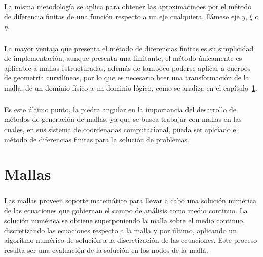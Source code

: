 \documentclass[letterpaper, openright, 12pt]{book}
\begin{document}
    \paragraph*{}
    La misma metodología se aplica para obtener las aproximacinoes por el método
    de diferencia finitas de una función respecto a un eje cualquiera, llámese
    eje $y$, $\xi$ o $\eta$.

    \paragraph*{}
    La mayor ventaja que presenta el método de diferencias finitas es su
    simplicidad de implementación, aunque presenta una limitante, el método
    únicamente es aplicable a mallas estructuradas, además de tampoco poderse
    aplicar a cuerpos de geometría curvilíneas, por lo que es necesario hcer una
    transformación de la malla, de un dominio físico a un dominio lógico, como
    se analiza en el capítulo~\ref{chap:mallas}.

    \paragraph*{}
    Es este último punto, la piedra angular en la importancia del desarrollo de
    métodos de generación de mallas, ya que se busca trabajar con mallas en las
    cuales, en sus sistema de coordenadas computacional, pueda ser aplciado el
    método de diferencias finitas para la solución de problemas.

    \chapter{Mallas}
    \label{chap:mallas}
    \paragraph*{}
    Las mallas proveen soporte matemático para llevar a cabo una solución
    numérica de las ecuaciones que gobiernan el campo de análisis como medio
    continuo. La solución numérica se obtiene superponiendo la malla sobre el
    medio continuo, discretizando las ecuaciones respecto a la malla y por
    último, aplicando un algoritmo numérico de solución a la discretización de
    las ecuaciones. Este proceso resulta ser una evaluación de la solución en
    los nodos de la malla.
\end{document}
